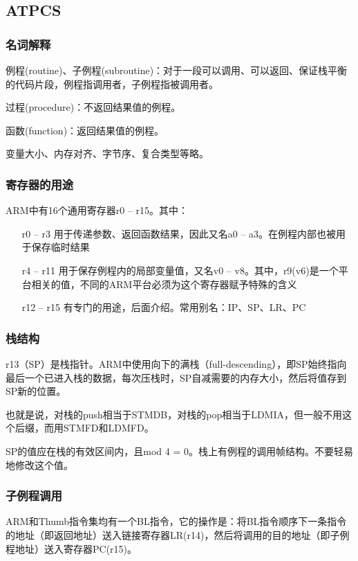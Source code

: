 \subsection{ATPCS}
\subsubsection{名词解释}
例程(routine)、子例程(subroutine)：对于一段可以调用、可以返回、保证栈平衡的代码片段，例程指调用者，子例程指被调用者。

过程(procedure)：不返回结果值的例程。

函数(function)：返回结果值的例程。

变量大小、内存对齐、字节序、复合类型等略。
\subsubsection{寄存器的用途}

ARM中有16个通用寄存器r0 – r15。其中：
\begin{itemize}
\item[r0 – r3] 用于传递参数、返回函数结果，因此又名a0 – a3。在例程内部也被用于保存临时结果
\item[r4 – r11] 用于保存例程内的局部变量值，又名v0 – v8。其中，r9(v6)是一个平台相关的值，不同的ARM平台必须为这个寄存器赋予特殊的含义
\item[r12 – r15] 有专门的用途，后面介绍。常用别名：IP、SP、LR、PC
\end{itemize}
\subsubsection{栈结构}

r13（SP）是栈指针。ARM中使用向下的满栈（full-descending），即SP始终指向最后一个已进入栈的数据，每次压栈时，SP自减需要的内存大小，然后将值存到SP新的位置。

也就是说，对栈的push相当于STMDB，对栈的pop相当于LDMIA，但一般不用这个后缀，而用STMFD和LDMFD。

SP的值应在栈的有效区间内，且mod 4 = 0。栈上有例程的调用帧结构。不要轻易地修改这个值。

\subsubsection{子例程调用}

ARM和Thumb指令集均有一个BL指令，它的操作是：将BL指令顺序下一条指令的地址（即返回地址）送入链接寄存器LR(r14)，然后将调用的目的地址（即子例程地址）送入寄存器PC(r15)。

